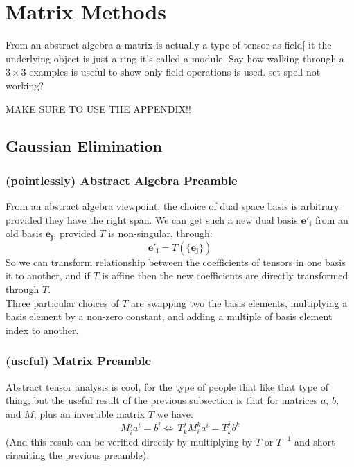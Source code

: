 
\chapter{Matrix Methods}
From an abstract algebra a matrix is actually a type of tensor as field[
it the underlying object is just a ring it's called a module.
Say how walking through a $3\times 3$ examples is useful to show only field operations is used.
set spell not working?

MAKE SURE TO USE THE APPENDIX!!

\section{Gaussian Elimination}
\subsection{(pointlessly) Abstract Algebra Preamble}
From an abstract algebra viewpoint,
the choice of dual space basis is arbitrary provided they have the right span.
We can get such a new dual basis $\mathbf{e'_i}$ from an old basis $\mathbf{e_j}$, provided $T$ is non-singular, through:
\[\mathbf{e'_i} = T(\{\mathbf{e_j}\})\]
So we can transform relationship between the coefficients of tensors in one basis it to another,
and if $T$ is affine then the new coefficients are directly transformed through $T$.
\\

Three particular choices of $T$ are swapping two the basis elements,
multiplying a basis element by a non-zero constant,
and adding a multiple of basis element index to another.

\subsection{(useful) Matrix Preamble}
Abstract tensor analysis is cool,
for the type of people that like that type of thing,
but the useful result of the previous subsection is that for matrices $a$, $b$, and $M$, plus an invertible matrix $T$ we have:
\[ M^j_ia^i = b^i \Leftrightarrow\, T^j_kM^k_ia^i = T^j_kb^k \]
(And this result can be verified directly by multiplying by $T$ or $T^{-1}$ and short-circuiting the previous preamble).
\\

